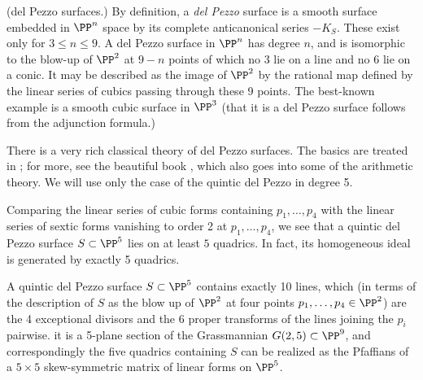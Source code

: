 \begin{fact} (del Pezzo surfaces.)\label{delPezzoSurfaces}
By definition,
a \emph{del Pezzo} surface is a smooth surface embedded in $\PP^n$ space by its complete anticanonical series $-K_S$. These exist only for $3\leq n\leq 9$. A del Pezzo surface in $\PP^n$ has degree $n$, and is isomorphic to the blow-up of $\PP^2$ at $9-n$ points of which no 3 lie on a line and no 6 lie on a conic. It may be described as the image of $\PP^2$ by the rational map defined by the linear series of cubics passing through these 9 points. The best-known example is a smooth cubic surface in $\PP^3$ (that it is a del Pezzo surface follows from the adjunction formula.)

There is a very rich classical theory of del Pezzo surfaces. The basics are treated in \cite[pp. 45--50]{Beauville}; for more, see the
beautiful book \cite{Manin}, which also goes into some of the arithmetic theory. We will use only the case of the quintic del Pezzo in degree 5.
\

Comparing the linear series  of cubic forms containing $p_1,\dots,p_4$ with the linear series  of sextic forms vanishing to order 2 at $p_1,\dots,p_4$, we see that a quintic del Pezzo surface $S \subset \PP^5$ lies on at least $5$ quadrics. In fact, its homogeneous ideal is generated by exactly 5 quadrics.


%
%
%


A quintic del Pezzo surface $S \subset \PP^5$ contains exactly 10 lines, which (in terms of the description of $S$ as the blow up of $\PP^2$ at four points $p_1,\dots,p_4 \in \PP^2$) are the 4 exceptional divisors and the 6 proper transforms of the lines joining the $p_i$ pairwise. 
 it is a 5-plane section of the Grassmannian $G(2,5) \subset \PP^9$, and correspondingly the five quadrics containing $S$ can be realized as the Pfaffians of a  $5\times 5$ skew-symmetric matrix of linear forms on $\PP^5$. 


\end{fact}
